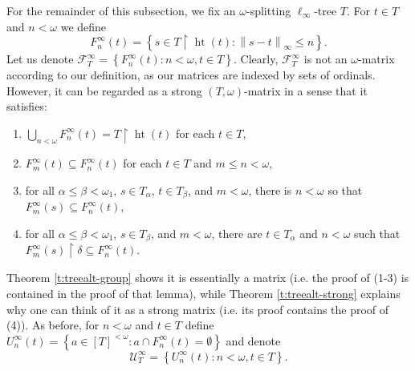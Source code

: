\documentclass{amsart}
\theoremstyle{plain}
\theoremstyle{definition}
\numberwithin{equation}{section}
\renewcommand{\a}{\alpha}
\renewcommand{\b}{\beta}
\renewcommand{\d}{\delta}
\renewcommand{\o}{\omega}
\newcommand{\ps}{\emptyset}
\newcommand{\rest}{\upharpoonright}
\newcommand{\sst}{\subseteq}
\newcommand{\cu}{\mathcal U}
\newcommand{\ft}{\mathcal F^{\infty}_T}
\newcommand{\set}[1]{\left\{#1\right\}}
\newcommand{\norm}[1]{\left\lVert#1\right\rVert_{\infty}}
\newcommand{\h}{\operatorname{ht}}
\begin{document}
For the remainder of this subsection, we fix an $\o$-splitting $\ell_{\infty}$-tree $T$.
For $t\in T$ and $n<\o$ we define $$F^{\infty}_n(t)=\set{s\in T\rest \h(t):\norm{s-t}\le n}.$$
Let us denote $\ft=\set{F^{\infty}_n(t):n<\o,t\in T}$.
Clearly, $\ft$ is not an $\o$-matrix according to our definition, as our matrices are indexed by sets of ordinals.
However, it can be regarded as a strong $(T,\o)$-matrix in a sense that it satisfies:
\begin{enumerate}
	\item $\bigcup_{n<\o}F^{\infty}_n(t)=T\rest\h(t)$ for each $t\in T$,
	\item $F^{\infty}_m(t)\sst F^{\infty}_n(t)$ for each $t\in T$ and $m\le n<\o$,
	\item for all $\a\le\b<\o_1$, $s\in T_{\a}$, $t\in T_{\b}$, and $m<\o$, there is $n<\o$ so that $F^{\infty}_m(s)\sst F^{\infty}_n(t)$,
	\item for all $\a\le\b<\o_1$, $s\in T_{\b}$, and $m<\o$, there are $t\in T_{\a}$ and $n<\o$ such that $F^{\infty}_m(s)\rest\d\sst F^{\infty}_n(t)$.
\end{enumerate}
Theorem \ref{t:treealt-group} shows it is essentially a matrix (i.e. the proof of (1-3) is contained in the proof of that lemma), while Theorem \ref{t:treealt-strong} explains why one can think of it as a strong matrix (i.e. its proof contains the proof of (4)).
As before, for $n<\o$ and $t\in T$ define $U^{\infty}_n(t)=\set{a\in [T]^{<\o}:a\cap F^{\infty}_n(t)=\ps}$ and denote $$\cu^{\infty}_T=\set{U^{\infty}_n(t):n<\o,t\in T}.$$
\end{document}
